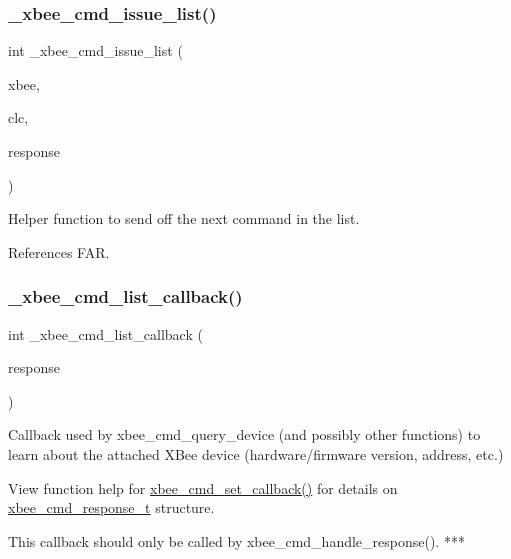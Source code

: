 \subsubsection{\texorpdfstring{\+\_\+xbee\+\_\+cmd\+\_\+issue\+\_\+list()}{\_xbee\_cmd\_issue\_list()}}
{\footnotesize\ttfamily int \+\_\+xbee\+\_\+cmd\+\_\+issue\+\_\+list (\begin{DoxyParamCaption}\item[{\hyperlink{structxbee__dev__t}{xbee\+\_\+dev\+\_\+t} $\ast$}]{xbee,  }\item[{\hyperlink{structxbee__command__list__context__t}{xbee\+\_\+command\+\_\+list\+\_\+context\+\_\+t} \hyperlink{group__hal_gaef060b3456fdcc093a7210a762d5f2ed}{F\+AR} $\ast$}]{clc,  }\item[{const \hyperlink{structxbee__cmd__response__t}{xbee\+\_\+cmd\+\_\+response\+\_\+t} \hyperlink{group__hal_gaef060b3456fdcc093a7210a762d5f2ed}{F\+AR} $\ast$}]{response }\end{DoxyParamCaption})}

Helper function to send off the next command in the list. 

References F\+AR.

\mbox{\label{group__xbee__atcmd_ga9f1bad1621dfd1d13b6f1102fc592d13}} 
\subsubsection{\texorpdfstring{\+\_\+xbee\+\_\+cmd\+\_\+list\+\_\+callback()}{\_xbee\_cmd\_list\_callback()}}
{\footnotesize\ttfamily int \+\_\+xbee\+\_\+cmd\+\_\+list\+\_\+callback (\begin{DoxyParamCaption}\item[{const \hyperlink{structxbee__cmd__response__t}{xbee\+\_\+cmd\+\_\+response\+\_\+t} \hyperlink{group__hal_gaef060b3456fdcc093a7210a762d5f2ed}{F\+AR} $\ast$}]{response }\end{DoxyParamCaption})}

Callback used by xbee\+\_\+cmd\+\_\+query\+\_\+device (and possibly other functions) to learn about the attached X\+Bee device (hardware/firmware version, address, etc.)

View function help for \hyperlink{group__xbee__atcmd_ga0a5d2e2e87743061c46abd53e379e014}{xbee\+\_\+cmd\+\_\+set\+\_\+callback()} for details on \hyperlink{structxbee__cmd__response__t}{xbee\+\_\+cmd\+\_\+response\+\_\+t} structure. \begin{DoxyVerb}This callback should only be called by xbee_cmd_handle_response(). ***\end{DoxyVerb}
 

